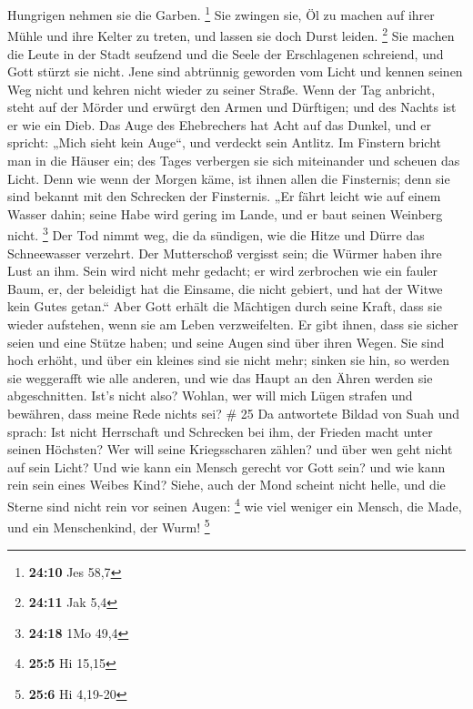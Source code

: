Hungrigen nehmen sie die Garben. \footnote{\textbf{24:10} Jes 58,7}
 Sie zwingen sie, Öl zu machen auf ihrer Mühle und ihre
Kelter zu treten, und lassen sie doch Durst leiden. \footnote{\textbf{24:11}
  Jak 5,4}  Sie machen die Leute in der Stadt seufzend und
die Seele der Erschlagenen schreiend, und Gott stürzt sie nicht.
 Jene sind abtrünnig geworden vom Licht und kennen seinen
Weg nicht und kehren nicht wieder zu seiner Straße.  Wenn
der Tag anbricht, steht auf der Mörder und erwürgt den Armen und
Dürftigen; und des Nachts ist er wie ein Dieb.  Das Auge
des Ehebrechers hat Acht auf das Dunkel, und er spricht: „Mich sieht
kein Auge``, und verdeckt sein Antlitz.  Im Finstern bricht
man in die Häuser ein; des Tages verbergen sie sich miteinander und
scheuen das Licht.  Denn wie wenn der Morgen käme, ist
ihnen allen die Finsternis; denn sie sind bekannt mit den Schrecken der
Finsternis.  „Er fährt leicht wie auf einem Wasser dahin;
seine Habe wird gering im Lande, und er baut seinen Weinberg nicht.
\footnote{\textbf{24:18} 1Mo 49,4}  Der Tod nimmt weg, die
da sündigen, wie die Hitze und Dürre das Schneewasser verzehrt.
 Der Mutterschoß vergisst sein; die Würmer haben ihre Lust
an ihm. Sein wird nicht mehr gedacht; er wird zerbrochen wie ein fauler
Baum,  er, der beleidigt hat die Einsame, die nicht
gebiert, und hat der Witwe kein Gutes getan.``  Aber Gott
erhält die Mächtigen durch seine Kraft, dass sie wieder aufstehen, wenn
sie am Leben verzweifelten.  Er gibt ihnen, dass sie sicher
seien und eine Stütze haben; und seine Augen sind über ihren Wegen.
 Sie sind hoch erhöht, und über ein kleines sind sie nicht
mehr; sinken sie hin, so werden sie weggerafft wie alle anderen, und wie
das Haupt an den Ähren werden sie abgeschnitten.  Ist's
nicht also? Wohlan, wer will mich Lügen strafen und bewähren, dass meine
Rede nichts sei? \# 25  Da antwortete Bildad von Suah und
sprach:  Ist nicht Herrschaft und Schrecken bei ihm, der
Frieden macht unter seinen Höchsten?  Wer will seine
Kriegsscharen zählen? und über wen geht nicht auf sein Licht?
 Und wie kann ein Mensch gerecht vor Gott sein? und wie kann
rein sein eines Weibes Kind?  Siehe, auch der Mond scheint
nicht helle, und die Sterne sind nicht rein vor seinen Augen:
\footnote{\textbf{25:5} Hi 15,15}  wie viel weniger ein
Mensch, die Made, und ein Menschenkind, der Wurm! \footnote{\textbf{25:6}
  Hi 4,19-20}

